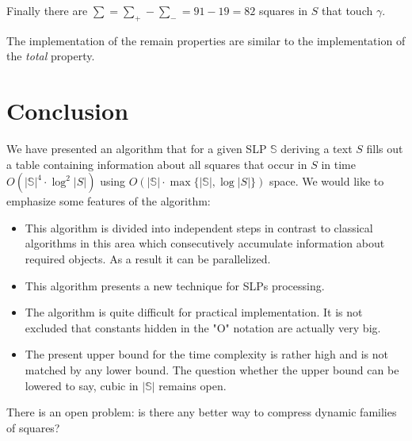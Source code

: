 \documentclass[11pt]{article}
\theoremstyle{break}
\newcommand{\slp}[1]{\mathbb{#1}}
\begin{document}
Finally there are $\sum = \sum_+ - \sum_- = 91 - 19 = 82$ squares in $S$ that touch $\gamma$.

The implementation of the remain properties are similar to the implementation of the \emph{total} property.

\section{Conclusion}

We have presented an algorithm that for a given SLP $\slp{S}$ deriving a text $S$ fills out a table containing
information about all squares that occur in $S$ in time $O(|\slp{S}|^4\cdot \log^2{|S|})$ using
$O(|\slp{S}|\cdot \max\{ |\slp{S}|, \log{|S|}\})$ space. We would like to emphasize some features of the
algorithm:

\begin{itemize}
\item This algorithm is divided into independent steps in contrast to classical algorithms in this area which
consecutively accumulate information about required objects. As a result it can be parallelized.

\item This algorithm presents a new technique for SLPs processing.

\item The algorithm is quite difficult for practical implementation. It is not excluded that constants hidden in the
"O" notation are actually very big.

\item The present upper bound for the time complexity is rather high and is not matched by any lower bound. The question
whether the upper bound can be lowered to say, cubic in $|\mathbb{S}|$ remains open.
\end{itemize}

There is an open problem: is there any better way to compress dynamic families of squares?

{}


\end{document}
